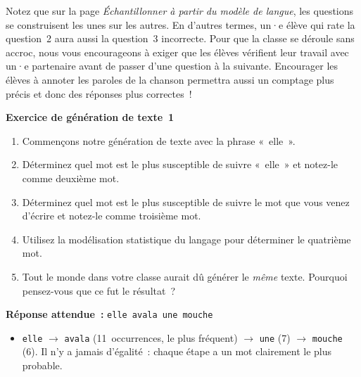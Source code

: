 \documentclass[12pt,a4paper]{article}
\begin{document}
\begin{instructornotes}
  Notez que sur la page \emph{Échantillonner à partir du modèle de langue}, les questions se construisent les unes sur les autres. En d'autres termes, un·e élève qui rate la question~2 aura aussi la question~3 incorrecte. Pour que la classe se déroule sans accroc, nous vous encourageons à exiger que les élèves vérifient leur travail avec un·e partenaire avant de passer d'une question à la suivante. Encourager les élèves à annoter les paroles de la chanson permettra aussi un comptage plus précis et donc des réponses plus correctes~!
\end{instructornotes}

\begin{activitybox}
  \textbf{Exercice de génération de texte~1}

  \begin{enumerate}[leftmargin=*]
    \item Commençons notre génération de texte avec la phrase «~elle~».
    \item Déterminez quel mot est le plus susceptible de suivre «~elle~» et notez-le comme deuxième mot.
    \item Déterminez quel mot est le plus susceptible de suivre le mot que vous venez d'écrire et notez-le comme troisième mot.
    \item Utilisez la modélisation statistique du langage pour déterminer le quatrième mot.
    \item Tout le monde dans votre classe aurait dû générer le \emph{même} texte. Pourquoi pensez-vous que ce fut le résultat~?
  \end{enumerate}

  \textbf{Réponse attendue~:} \texttt{elle avala une mouche}

  \begin{itemize}
    \item \texttt{elle} $\to$ \texttt{avala} (11~occurrences, le plus fréquent) $\to$ \texttt{une} (7) $\to$ \texttt{mouche} (6). Il n'y a jamais d'égalité~: chaque étape a un mot clairement le plus probable.
  \end{itemize}
\end{activitybox}
\end{document}
